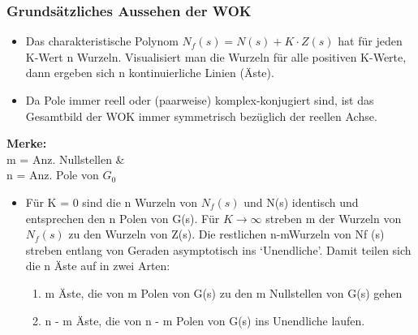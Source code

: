 \subsubsection{Grundsätzliches Aussehen der WOK }
\begin{minipage}{14cm}
	\begin{itemize}
		\item  Das charakteristische Polynom $N_f (s) = N(s)+K \cdot Z(s)$ hat für jeden K-Wert
		n Wurzeln. Visualisiert man die Wurzeln für alle positiven K-Werte, dann
		ergeben sich n kontinuierliche Linien (Äste).
		\item  Da Pole immer reell oder (paarweise) komplex-konjugiert sind, ist das Gesamtbild
		der WOK immer symmetrisch bezüglich der reellen Achse.
	\end{itemize}
\end{minipage}
\hspace{0.5cm}
\begin{minipage}{4cm}
	\textbf{Merke:} \\
		m = Anz. Nullstellen \& \\
		n = Anz. Pole von $G_0$
\end{minipage}
\begin{itemize}
		\item  Für K = 0 sind die n Wurzeln von $N_f(s)$ und N(s) identisch und entsprechen
		den n Polen von G(s).
		Für $K \rightarrow \infty$ streben m der Wurzeln von $N_f(s)$ zu den Wurzeln von Z(s). Die
		restlichen n-mWurzeln von Nf (s) streben entlang von Geraden asymptotisch
		ins ‘Unendliche’.
		Damit teilen sich die n Äste auf in zwei Arten:
		\begin{enumerate}
			\item m Äste, die von m Polen von G(s) zu den m Nullstellen von G(s) gehen
			\item n - m Äste, die von n - m Polen von G(s) ins Unendliche laufen.
		\end{enumerate}
\end{itemize}


